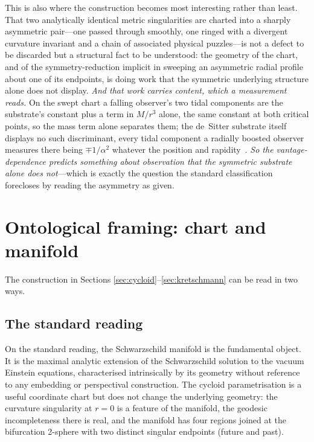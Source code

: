 \documentclass[11pt,a4paper]{article}
\theoremstyle{definition}
\begin{document}
This is also where the construction becomes most interesting rather than least. That two analytically identical metric singularities are charted into a sharply asymmetric pair---one passed through smoothly, one ringed with a divergent curvature invariant and a chain of associated physical puzzles---is not a defect to be discarded but a structural fact to be understood: the geometry of the chart, and of the symmetry-reduction implicit in sweeping an asymmetric radial profile about one of its endpoints, is doing work that the symmetric underlying structure alone does not display. \emph{And that work carries content, which a measurement reads.} On the swept chart a falling observer's two tidal components are the substrate's constant plus a term in $M/r^{3}$ alone, the same constant at both critical points, so the mass term alone separates them; the de~Sitter substrate itself displays no such discriminant, every tidal component a radially boosted observer measures there being $\mp1/\alpha^{2}$ whatever the position and rapidity~\cite{JanzenCRframework}. \emph{So the vantage-dependence predicts something about observation that the symmetric substrate alone does not}---which is exactly the question the standard classification forecloses by reading the asymmetry as given.

\section{Ontological framing: chart and manifold}\label{sec:ontology}

The construction in Sections \ref{sec:cycloid}--\ref{sec:kretschmann} can be read in two ways.

\subsection{The standard reading}

On the standard reading, the Schwarzschild manifold is the fundamental object. It is the maximal analytic extension of the Schwarzschild solution to the vacuum Einstein equations, characterised intrinsically by its geometry without reference to any embedding or perspectival construction. The cycloid parametrisation is a useful coordinate chart but does not change the underlying geometry: the curvature singularity at $r = 0$ is a feature of the manifold, the geodesic incompleteness there is real, and the manifold has four regions joined at the bifurcation 2-sphere with two distinct singular endpoints (future and past).
\end{document}
